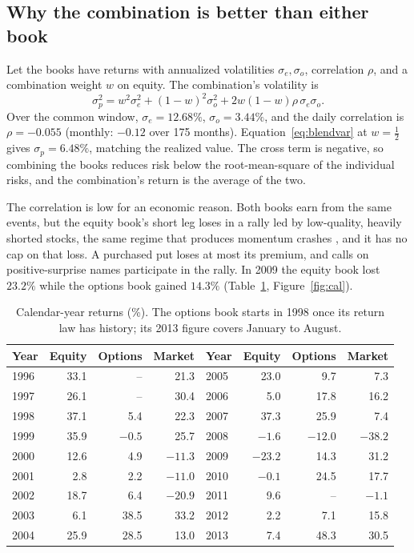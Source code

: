 \documentclass[11pt]{article}
\theoremstyle{definition}
\newcommand{\1}{\mathbf{1}}
\begin{document}
\subsection{Why the combination is better than either book}

Let the books have returns with annualized volatilities $\sigma_e,\sigma_o$, correlation
$\rho$, and a combination weight $w$ on equity. The combination's volatility is
\begin{equation}
  \sigma_p^2=w^2\sigma_e^2+(1-w)^2\sigma_o^2+2w(1-w)\rho\,\sigma_e\sigma_o.
  \label{eq:blendvar}
\end{equation}
Over the common window, $\sigma_e=12.68\%$, $\sigma_o=3.44\%$, and the daily correlation is
$\rho=-0.055$ (monthly: $-0.12$ over 175 months). Equation~\eqref{eq:blendvar} at $w=\tfrac12$
gives $\sigma_p=6.48\%$, matching the realized value. The cross term is negative, so
combining the books reduces risk below the root-mean-square of the individual risks, and
the combination's return is the average of the two.

The correlation is low for an economic reason. Both books earn from the same events, but the
equity book's short leg loses in a rally led by low-quality, heavily shorted stocks, the same
regime that produces momentum crashes \citep{DanielMoskowitz2016}, and it has no cap on that
loss. A purchased put loses at most its premium, and calls on positive-surprise names
participate in the rally. In 2009 the equity book lost $23.2\%$ while the options book gained
$14.3\%$ (Table~\ref{tab:calendar}, Figure~\ref{fig:cal}).

\begin{table}[t]\centering\small
\caption{Calendar-year returns (\%). The options book starts in 1998 once its return law has
history; its 2013 figure covers January to August.}\label{tab:calendar}
\begin{tabular}{lrrr@{\hspace{2em}}lrrr}
\toprule
Year & Equity & Options & Market & Year & Equity & Options & Market\\
\midrule
1996 & 33.1 & -- & 21.3 & 2005 & 23.0 & 9.7 & 7.3\\
1997 & 26.1 & -- & 30.4 & 2006 & 5.0 & 17.8 & 16.2\\
1998 & 37.1 & 5.4 & 22.3 & 2007 & 37.3 & 25.9 & 7.4\\
1999 & 35.9 & $-0.5$ & 25.7 & 2008 & $-1.6$ & $-12.0$ & $-38.2$\\
2000 & 12.6 & 4.9 & $-11.3$ & 2009 & $-23.2$ & 14.3 & 31.2\\
2001 & 2.8 & 2.2 & $-11.0$ & 2010 & $-0.1$ & 24.5 & 17.7\\
2002 & 18.7 & 6.4 & $-20.9$ & 2011 & 9.6 & -- & $-1.1$\\
2003 & 6.1 & 38.5 & 33.2 & 2012 & 2.2 & 7.1 & 15.8\\
2004 & 25.9 & 28.5 & 13.0 & 2013 & 7.4 & 48.3 & 30.5\\
\bottomrule
\end{tabular}
\end{table}
\end{document}
